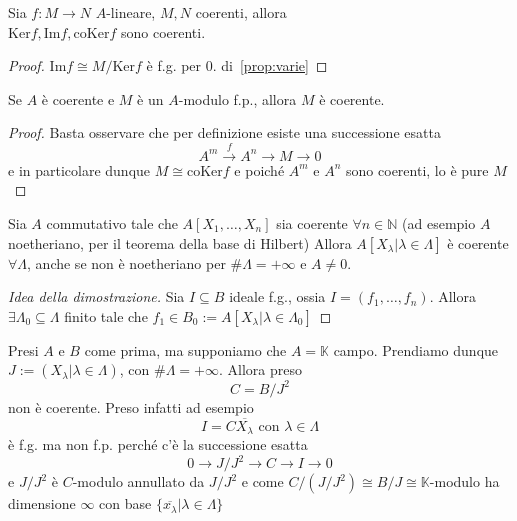 \begin{corollary}{}
    Sia \(f: M \to N\) \(A\)-lineare, \(M, N\) coerenti, allora \\ \(\mathrm{Ker}f, \mathrm{Im}f, \mathrm{coKer}f\) sono coerenti.
\end{corollary}
\begin{proof}{}
    \(\mathrm{Im}f \cong M / \mathrm{Ker} f\) è f.g. per 0. di~\ref{prop:varie}
\end{proof}
\begin{corollary}{}
    Se \(A\) è coerente e \(M\) è un \(A\)-modulo f.p., allora \(M\) è coerente.
\end{corollary}
\begin{proof}{}
    Basta osservare che per definizione esiste una successione esatta 
    \[
      A^{m} \overset{f}{\to } A^{n} \to M \to 0
    \]
    e in particolare dunque \(M \cong \mathrm{coKer}f\) e poiché \(A^{m}\) e \(A^{n}\) sono coerenti, lo è pure \(M\) 
\end{proof}
\begin{example}{}
    Sia \(A\) commutativo tale che \(A[X_{1}, \dots, X_{n}]\) sia coerente \(\forall n \in \mathbb{N}\) (ad esempio \(A\) noetheriano, per il teorema della base di Hilbert)
    Allora \(A[X_{\lambda} | \lambda \in \Lambda]\) è coerente \(\forall \Lambda\), anche se non è noetheriano per \(\# \Lambda = +\infty\) e \(A \neq 0\).
    \begin{proof}[Idea della dimostrazione]
        Sia \(I \subseteq B \) ideale f.g., ossia \(I = {(f_{1}, \dots, f_{n})}\). Allora \(\exists \Lambda_{0} \subseteq \Lambda \) finito tale che \(f_{1} \in B_{0} := A[X_\lambda | \lambda \in \Lambda_{0}]\) 
    \end{proof}
\end{example}
\begin{example}
    Presi \(A\) e \(B\) come prima, ma supponiamo che \(A = \mathbb{K}\) campo.
    Prendiamo dunque \(J := {(X_{\lambda} | \lambda \in \Lambda)}\), con \(\#
    \Lambda = +\infty\). Allora preso
    \[
      C = B / J^2
    \]
    non è coerente. Preso infatti ad esempio 
    \[
      I = C \overline{X_{\lambda} } \text{  con }\lambda \in \Lambda
    \]
    è f.g. ma non f.p. perché c'è la successione esatta 
    \[
      0 \to J / J^2 \to C \to I \to 0
    \]
    e \(J / J^2\) è \(C\)-modulo annullato da \(J / J^2\) e come \(C / {(J / J^2)} \cong B / J \cong \mathbb{K}\)-modulo ha dimensione \(\infty\)  con base \(\{\overline{x_{\lambda} }| \lambda \in \Lambda \} \) 
\end{example}
